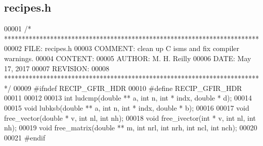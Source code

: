 \subsection{recipes.\+h}
\label{recipes_8h_source}

\begin{DoxyCode}
00001 \textcolor{comment}{/* ************************************************************************ }
00002 \textcolor{comment}{   FILE:    recipes.h}
00003 \textcolor{comment}{   COMMENT: clean up C isms and fix compiler warnings. }
00004 \textcolor{comment}{   CONTENT:}
00005 \textcolor{comment}{   AUTHOR:  M. H. Reilly }
00006 \textcolor{comment}{   DATE:    May 17, 2017}
00007 \textcolor{comment}{   REVISION:}
00008 \textcolor{comment}{   ************************************************************************ */}
00009 \textcolor{preprocessor}{#ifndef RECIP\_GFIR\_HDR}
00010 \textcolor{preprocessor}{#define RECIP\_GFIR\_HDR}
00011 
00012 
00013 \textcolor{keywordtype}{int} ludcmp(\textcolor{keywordtype}{double} ** a, \textcolor{keywordtype}{int} n, \textcolor{keywordtype}{int} * indx, \textcolor{keywordtype}{double} * d);
00014 
00015 \textcolor{keywordtype}{void} lubksb(\textcolor{keywordtype}{double} ** a, \textcolor{keywordtype}{int} n, \textcolor{keywordtype}{int} * indx, \textcolor{keywordtype}{double} * b); 
00016 
00017 \textcolor{keywordtype}{void} free_vector(\textcolor{keywordtype}{double} * v, \textcolor{keywordtype}{int} nl, \textcolor{keywordtype}{int} nh); 
00018 \textcolor{keywordtype}{void} free_ivector(\textcolor{keywordtype}{int} * v, \textcolor{keywordtype}{int} nl, \textcolor{keywordtype}{int} nh);
00019 \textcolor{keywordtype}{void} free_matrix(\textcolor{keywordtype}{double} ** m, \textcolor{keywordtype}{int} nrl, \textcolor{keywordtype}{int} nrh, \textcolor{keywordtype}{int} ncl, \textcolor{keywordtype}{int} nch);
00020 
00021 \textcolor{preprocessor}{#endif}
\end{DoxyCode}
